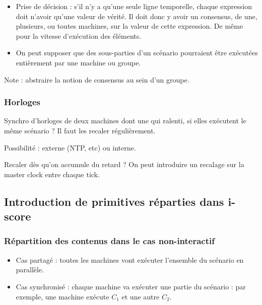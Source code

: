 \documentclass{article}
\begin{document}
\begin{itemize}
	\item Prise de décision : s'il n'y a qu'une seule ligne temporelle, chaque expression doit n'avoir qu'une valeur de vérité. Il doit donc y avoir un consensus, de une, plusieurs, ou toutes machines, sur la valeur de cette expression. De même pour la vitesse d'exécution des éléments.
	\item On peut supposer que des sous-parties d'un scénario pourraient être exécutées entièrement par une machine ou groupe.
	
\end{itemize}

Note : abstraire la notion de consensus au sein d'un groupe.

\subsubsection{Horloges}

Synchro d'horloges de deux machines dont une qui ralenti, si elles exécutent le même 
scénario ? Il faut les recaler régulièrement. 

Possibilité : externe (NTP, etc) ou interne.

Recaler dès qu'on accumule du retard ?
On peut introduire un recalage sur la master clock entre chaque tick.

\subsection{Introduction de primitives réparties dans i-score}

\subsubsection{Répartition des contenus dans le cas non-interactif}
\begin{figure}[h]
    \centering
    \begin{tikzpicture}
    
    \end{tikzpicture}
    \label{scenar.simple}
\end{figure}

\begin{itemize}
    \item Cas partagé : toutes les machines vont exécuter l'ensemble du scénario en parallèle.
    \item Cas synchronisé : chaque machine va exécuter une partie du scénario : par exemple, une machine exécute $C_1$ et une autre $C_2$.
\end{itemize}
\end{document}
